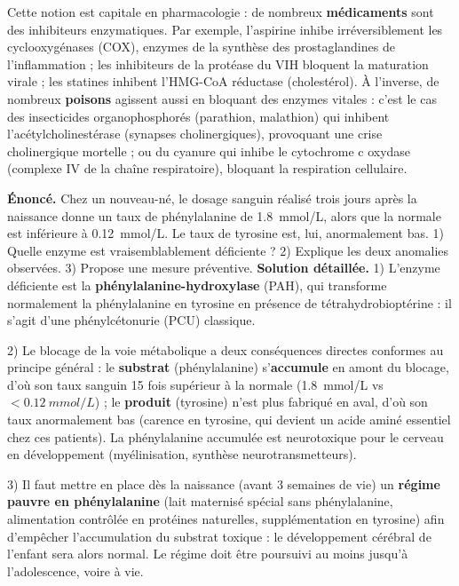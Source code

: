 \documentclass[11pt]{article}
\begin{document}
Cette notion est capitale en pharmacologie : de nombreux \textbf{médicaments} sont des inhibiteurs enzymatiques. Par exemple, l'aspirine inhibe irréversiblement les cyclooxygénases (COX), enzymes de la synthèse des prostaglandines de l'inflammation ; les inhibiteurs de la protéase du VIH bloquent la maturation virale ; les statines inhibent l'HMG-CoA réductase (cholestérol). À l'inverse, de nombreux \textbf{poisons} agissent aussi en bloquant des enzymes vitales : c'est le cas des insecticides organophosphorés (parathion, malathion) qui inhibent l'acétylcholinestérase (synapses cholinergiques), provoquant une crise cholinergique mortelle ; ou du cyanure qui inhibe le cytochrome c oxydase (complexe IV de la chaîne respiratoire), bloquant la respiration cellulaire.

\begin{exoresolu}
\textbf{Énoncé.} Chez un nouveau-né, le dosage sanguin réalisé trois jours après la naissance donne un taux de phénylalanine de \SI{1.8}{mmol/L}, alors que la normale est inférieure à \SI{0.12}{mmol/L}. Le taux de tyrosine est, lui, anormalement bas. 1) Quelle enzyme est vraisemblablement déficiente ? 2) Explique les deux anomalies observées. 3) Propose une mesure préventive.
\tcblower
\textbf{Solution détaillée.}
1) L'enzyme déficiente est la \textbf{phénylalanine-hydroxylase} (PAH), qui transforme normalement la phénylalanine en tyrosine en présence de tétrahydrobioptérine : il s'agit d'une phénylcétonurie (PCU) classique.

2) Le blocage de la voie métabolique a deux conséquences directes conformes au principe général : le \textbf{substrat} (phénylalanine) s'\textbf{accumule} en amont du blocage, d'où son taux sanguin 15 fois supérieur à la normale (\SI{1.8}{mmol/L} vs $<\SI{0.12}{mmol/L}$) ; le \textbf{produit} (tyrosine) n'est plus fabriqué en aval, d'où son taux anormalement bas (carence en tyrosine, qui devient un acide aminé essentiel chez ces patients). La phénylalanine accumulée est neurotoxique pour le cerveau en développement (myélinisation, synthèse neurotransmetteurs).

3) Il faut mettre en place dès la naissance (avant 3 semaines de vie) un \textbf{régime pauvre en phénylalanine} (lait maternisé spécial sans phénylalanine, alimentation contrôlée en protéines naturelles, supplémentation en tyrosine) afin d'empêcher l'accumulation du substrat toxique : le développement cérébral de l'enfant sera alors normal. Le régime doit être poursuivi au moins jusqu'à l'adolescence, voire à vie.
\end{exoresolu}
\end{document}
